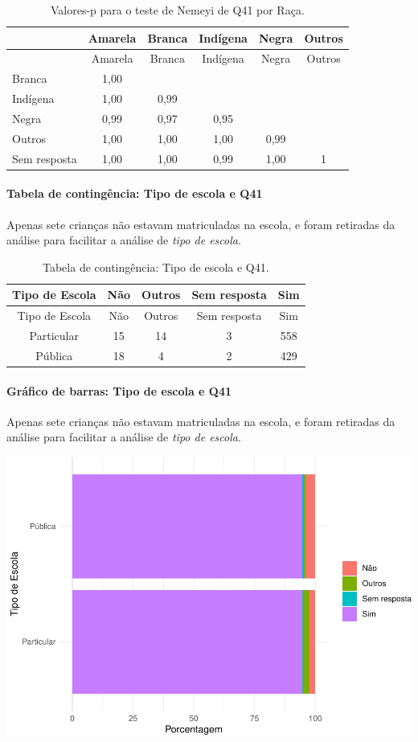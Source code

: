 \documentclass[]{article}
\let\oldparagraph\paragraph
\renewcommand{\paragraph}[1]{\oldparagraph{#1}\mbox{}}
\begin{document}
\begin{longtable}[]{@{}lccccc@{}}
\caption{\label{tab:unnamed-chunk-1644}Valores-p para o teste de Nemeyi de Q41 por Raça.}\tabularnewline
\toprule
& Amarela & Branca & Indígena & Negra & Outros\tabularnewline
\midrule
\endfirsthead
\toprule
& Amarela & Branca & Indígena & Negra & Outros\tabularnewline
\midrule
\endhead
Branca & 1,00 & & & &\tabularnewline
Indígena & 1,00 & 0,99 & & &\tabularnewline
Negra & 0,99 & 0,97 & 0,95 & &\tabularnewline
Outros & 1,00 & 1,00 & 1,00 & 0,99 &\tabularnewline
Sem resposta & 1,00 & 1,00 & 0,99 & 1,00 & 1\tabularnewline
\bottomrule
\end{longtable}

\cleardoublepage

\hypertarget{tabela-de-continguxeancia-tipo-de-escola-e-q41}{%
\paragraph{Tabela de contingência: Tipo de escola e Q41}\label{tabela-de-continguxeancia-tipo-de-escola-e-q41}}

Apenas sete crianças não estavam matriculadas na escola, e foram retiradas da análise para facilitar a análise de \emph{tipo de escola}.

\begin{longtable}[]{@{}ccccc@{}}
\caption{\label{tab:unnamed-chunk-1645}Tabela de contingência: Tipo de escola e Q41.}\tabularnewline
\toprule
Tipo de Escola & Não & Outros & Sem resposta & Sim\tabularnewline
\midrule
\endfirsthead
\toprule
Tipo de Escola & Não & Outros & Sem resposta & Sim\tabularnewline
\midrule
\endhead
Particular & 15 & 14 & 3 & 558\tabularnewline
Pública & 18 & 4 & 2 & 429\tabularnewline
\bottomrule
\end{longtable}

\hypertarget{gruxe1fico-de-barras-tipo-de-escola-e-q41}{%
\paragraph{Gráfico de barras: Tipo de escola e Q41}\label{gruxe1fico-de-barras-tipo-de-escola-e-q41}}

Apenas sete crianças não estavam matriculadas na escola, e foram retiradas da análise para facilitar a análise de \emph{tipo de escola}.

\begin{center}\includegraphics[width=0.75\linewidth]{relatorio_covid19_files/figure-latex/unnamed-chunk-1646-1} \end{center}
\end{document}
